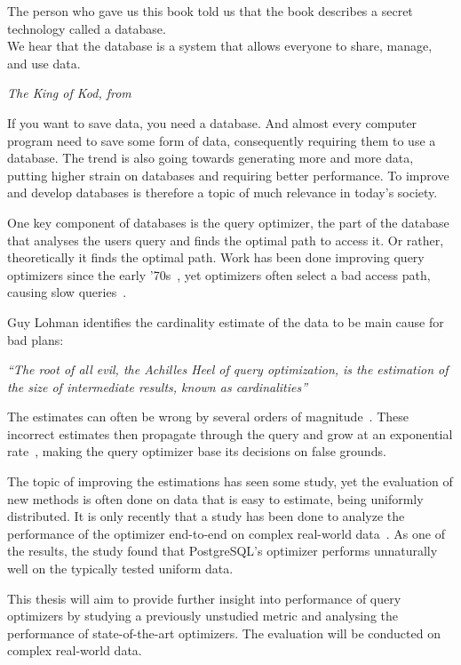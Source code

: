 \epigraph{The person who gave us this book told us that the book describes a
  secret technology called a database.\\
  We hear that the database is a system that allows everyone to share, manage,
  and use data.}{\textit{The King of Kod, from~\cite[p.~6]{takahashi_2009_manga_tmgtd}}}

If you want to save data, you need a database. And almost every computer program
need to save some form of data, consequently requiring them to use a database.
The trend is also going towards generating more and more data, putting higher
strain on databases and requiring better performance. To improve and develop
databases is therefore a topic of much relevance in today's society.

One key component of databases is the query optimizer, the part of the database
that analyses the users query and finds the optimal path to access it. Or
rather, theoretically it finds the optimal path. Work has been done improving
query optimizers since the early '70s~\cite{chaudhuri_1998_overview_aooqoirs},
yet optimizers often select a bad access path, causing slow
queries~\cite{leis_2015_how_hgaqor}.

Guy Lohman identifies the cardinality estimate of the data to be main cause for bad plans:

\textit{``The root of all evil, the Achilles Heel of query optimization, is the
  estimation of the size of intermediate results, known as cardinalities''}

The estimates can often be wrong by several orders of
magnitude~\cite{lohman_query_iqoap}. These incorrect estimates then propagate
through the query and grow at an exponential
rate~\cite{ioannidis_1991_propagation_otpoeitsojr}, making the query optimizer
base its decisions on false grounds.

The topic of improving the estimations has seen some study, yet the evaluation
of new methods is often done on data that is easy to estimate, being uniformly
distributed. It is only recently that a study has been done to analyze the
performance of the optimizer end-to-end on complex real-world
data~\cite{leis_2015_how_hgaqor}. As one of the results, the study found that
PostgreSQL's optimizer performs unnaturally well on the typically tested uniform
data.

This thesis will aim to provide further insight into performance of
query optimizers by studying a previously unstudied metric and analysing the
performance of state-of-the-art optimizers. The evaluation will be conducted on
complex real-world data.

